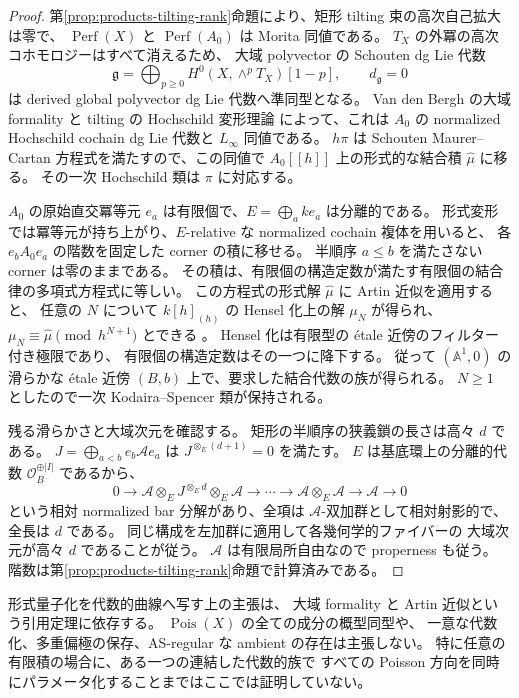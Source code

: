 \begin{proof}
第\ref{prop:products-tilting-rank}命題により、矩形 tilting 束の高次自己拡大は零で、
$\operatorname{Perf}(X)$ と $\operatorname{Perf}(A_0)$ は Morita 同値である。
$T_X$ の外冪の高次コホモロジーはすべて消えるため、
大域 polyvector の Schouten dg Lie 代数
\[
\mathfrak g=\bigoplus_{p\ge0}H^0(X,\wedge^pT_X)[1-p],\qquad d_{\mathfrak g}=0
\]
は derived global polyvector dg Lie 代数へ準同型となる。
Van den Bergh の大域 formality と tilting の Hochschild 変形理論
\cite{VdBGlobal,BW2024} によって、これは $A_0$ の
normalized Hochschild cochain dg Lie 代数と $L_\infty$ 同値である。
$h\pi$ は Schouten Maurer--Cartan 方程式を満たすので、この同値で
$A_0[[h]]$ 上の形式的な結合積 $\widehat\mu$ に移る。
その一次 Hochschild 類は $\pi$ に対応する。

$A_0$ の原始直交冪等元 $e_a$ は有限個で、$E=\bigoplus_a ke_a$ は分離的である。
形式変形では冪等元が持ち上がり、$E$-relative な normalized cochain 複体を用いると、
各 $e_bA_0e_a$ の階数を固定した corner の積に移せる。
半順序 $a\le b$ を満たさない corner は零のままである。
その積は、有限個の構造定数が満たす有限個の結合律の多項式方程式に等しい。
この方程式の形式解 $\widehat\mu$ に Artin 近似を適用すると、
任意の $N$ について $k[h]_{(h)}$ の Hensel 化上の解 $\mu_N$ が得られ、
$\mu_N\equiv\widehat\mu\pmod {h^{N+1}}$ とできる
\cite{StacksArtin}。
Hensel 化は有限型の étale 近傍のフィルター付き極限であり、
有限個の構造定数はその一つに降下する。
従って $(\mathbb A^1,0)$ の滑らかな étale 近傍
$(B,b)$ 上で、要求した結合代数の族が得られる。
$N\ge1$ としたので一次 Kodaira--Spencer 類が保持される。

残る滑らかさと大域次元を確認する。
矩形の半順序の狭義鎖の長さは高々 $d$ である。
$J=\bigoplus_{a<b}e_b\mathcal Ae_a$ は
$J^{\otimes_E(d+1)}=0$ を満たす。
$E$ は基底環上の分離的代数 $\mathcal O_B^{\oplus |I|}$ であるから、
\[
 0\to \mathcal A\otimes_EJ^{\otimes_Ed}\otimes_E\mathcal A
 \to\cdots\to\mathcal A\otimes_E\mathcal A\to\mathcal A\to0
\]
という相対 normalized bar 分解があり、全項は
$\mathcal A$-双加群として相対射影的で、全長は $d$ である。
同じ構成を左加群に適用して各幾何学的ファイバーの
大域次元が高々 $d$ であることが従う。
$\mathcal A$ は有限局所自由なので properness も従う。
階数は第\ref{prop:products-tilting-rank}命題で計算済みである。
\end{proof}

\begin{remark}[制約と証明の所在]
形式量子化を代数的曲線へ写す上の主張は、
大域 formality と Artin 近似という引用定理に依存する。
$\operatorname{Pois}(X)$ の全ての成分の概型同型や、
一意な代数化、多重偏極の保存、AS-regular な ambient の存在は主張しない。
特に任意の有限積の場合に、ある一つの連結した代数的族で
すべての Poisson 方向を同時にパラメータ化することまではここでは証明していない。
\end{remark}
